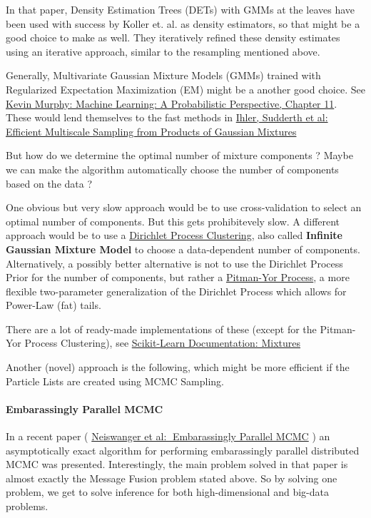 In that paper, Density Estimation Trees (DETs) with GMMs at the leaves
have been used with success by Koller et. al. as density estimators, so
that might be a good choice to make as well. They iteratively refined
these density estimates using an iterative approach, similar to the
resampling mentioned above.

Generally, Multivariate Gaussian Mixture Models (GMMs) trained with
Regularized Expectation Maximization (EM) might be a another good
choice. See \href{http://www.cs.ubc.ca/~murphyk/MLbook/}{Kevin Murphy:
Machine Learning: A Probabilistic Perspective, Chapter 11}. These would
lend themselves to the fast methods in
\href{http://ssg.mit.edu/nbp/papers/nips03.pdf}{Ihler, Sudderth et al:
Efficient Multiscale Sampling from Products of Gaussian Mixtures}

But how do we determine the optimal number of mixture components ? Maybe
we can make the algorithm automatically choose the number of components
based on the data ?

One obvious but very slow approach would be to use cross-validation to
select an optimal number of components. But this gets prohibitevely
slow. A different approach would be to use a
\href{http://www.gatsby.ucl.ac.uk/~edward/pub/inf.mix.nips.99.pdf}{Dirichlet
Process Clustering}, also called \textbf{Infinite Gaussian Mixture
Model} to choose a data-dependent number of components. Alternatively, a
possibly better alternative is not to use the Dirichlet Process Prior
for the number of components, but rather a
\href{http://en.wikipedia.org/wiki/Pitman\%E2\%80\%93Yor\_process}{Pitman-Yor
Process}, a more flexible two-parameter generalization of the Dirichlet
Process which allows for Power-Law (fat) tails.

There are a lot of ready-made implementations of these (except for the
Pitman- Yor Process Clustering), see
\href{http\%20://scikit-learn.org/stable/modules/mixture.html}{Scikit-Learn
Documentation: Mixtures}

Another (novel) approach is the following, which might be more efficient
if the Particle Lists are created using MCMC Sampling.

\paragraph{Embarassingly Parallel MCMC}

In a recent paper (
\href{http://arxiv.org/pdf/1311.4780v1.pdf}{Neiswanger et al:
Embarassingly Parallel MCMC} ) an asymptotically exact algorithm for
performing embarassingly parallel distributed MCMC was presented.
Interestingly, the main problem solved in that paper is almost exactly
the Message Fusion problem stated above. So by solving one problem, we
get to solve inference for both high-dimensional and big-data problems.

